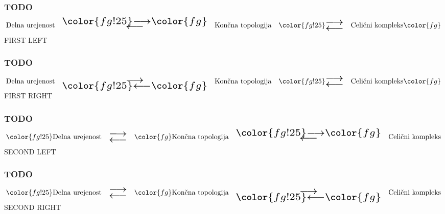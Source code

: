 \documentclass{beamer}
\newcommand{\semitransp}[2][25]{\color{fg!#1}#2\color{fg}}
\begin{document}
\begin{frame}[t] %
    \frametitle{TODO}
    \vspace{-8mm}
    \[
        \text{Delna urejenost}
        \quad
        \raisebox{-3pt}{\scalebox{2}{$\substack{\longleftarrow\\[-1em] \semitransp{\longrightarrow} }$}}
        \quad
        \text{Končna topologija}
        \quad
        \semitransp{
            \raisebox{-3pt}{\scalebox{2}{$\substack{\longleftarrow\\[-1em] \longrightarrow }$}}
            \quad
            \text{Celični kompleks}
        }
    \]
    \vspace{1cm}
    FIRST LEFT 
\end{frame}
\begin{frame}[t] %
    \frametitle{TODO}
    \vspace{-8mm}
    \[
        \text{Delna urejenost}
        \quad
        \raisebox{-3pt}{\scalebox{2}{$\substack{\semitransp{\longleftarrow}\\[-1em] \longrightarrow }$}}
        \quad
        \text{Končna topologija}
        \quad
        \semitransp{
            \raisebox{-3pt}{\scalebox{2}{$\substack{\longleftarrow\\[-1em] \longrightarrow }$}}
            \quad
            \text{Celični kompleks}
        }
    \]
    \vspace{1cm}
    FIRST RIGHT 
\end{frame}
\begin{frame}[t] %
    \frametitle{TODO}
    \vspace{-8mm}
    \[
        \semitransp{
            \text{Delna urejenost}
            \quad
            \raisebox{-3pt}{\scalebox{2}{$\substack{\longleftarrow\\[-1em] \longrightarrow }$}}
            \quad
        }
        \text{Končna topologija}
        \quad
        \raisebox{-3pt}{\scalebox{2}{$\substack{\longleftarrow\\[-1em] \semitransp{\longrightarrow} }$}}
        \quad
        \text{Celični kompleks}
    \]
    \vspace{1cm}
    SECOND LEFT 
\end{frame}
\begin{frame}[t] %
    \frametitle{TODO}
    \vspace{-8mm}
    \[
        \semitransp{
        \text{Delna urejenost}
        \quad
        \raisebox{-3pt}{\scalebox{2}{$\substack{\longleftarrow\\[-1em] \longrightarrow }$}}
        \quad
        }
        \text{Končna topologija}
        \quad
        \raisebox{-3pt}{\scalebox{2}{$\substack{\semitransp{\longleftarrow}\\[-1em] \longrightarrow }$}}
        \quad
        \text{Celični kompleks}
    \]
    \vspace{1cm}
    SECOND RIGHT 
\end{frame}
\end{document}

